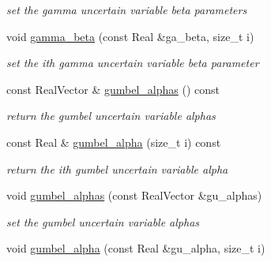 \begin{DoxyCompactItemize}
\begin{DoxyCompactList}\small\item\em set the gamma uncertain variable beta parameters \end{DoxyCompactList}\item 
void \hyperlink{classPecos_1_1AleatoryDistParams_a71537fcb2a324d0f6850eeacb54570cd}{gamma\+\_\+beta} (const Real \&ga\+\_\+beta, size\+\_\+t i)\label{classPecos_1_1AleatoryDistParams_a71537fcb2a324d0f6850eeacb54570cd}

\begin{DoxyCompactList}\small\item\em set the ith gamma uncertain variable beta parameter \end{DoxyCompactList}\item 
const Real\+Vector \& \hyperlink{classPecos_1_1AleatoryDistParams_ae4cc8a3646b394b15be4676cd3200bf1}{gumbel\+\_\+alphas} () const \label{classPecos_1_1AleatoryDistParams_ae4cc8a3646b394b15be4676cd3200bf1}

\begin{DoxyCompactList}\small\item\em return the gumbel uncertain variable alphas \end{DoxyCompactList}\item 
const Real \& \hyperlink{classPecos_1_1AleatoryDistParams_a4665d745cda45d1b57dbbc698bebb15c}{gumbel\+\_\+alpha} (size\+\_\+t i) const \label{classPecos_1_1AleatoryDistParams_a4665d745cda45d1b57dbbc698bebb15c}

\begin{DoxyCompactList}\small\item\em return the ith gumbel uncertain variable alpha \end{DoxyCompactList}\item 
void \hyperlink{classPecos_1_1AleatoryDistParams_aa4b0f908acc066a478f6941904d18279}{gumbel\+\_\+alphas} (const Real\+Vector \&gu\+\_\+alphas)\label{classPecos_1_1AleatoryDistParams_aa4b0f908acc066a478f6941904d18279}

\begin{DoxyCompactList}\small\item\em set the gumbel uncertain variable alphas \end{DoxyCompactList}\item 
void \hyperlink{classPecos_1_1AleatoryDistParams_a1556dd22bc76bf809eeeba1775fb4b66}{gumbel\+\_\+alpha} (const Real \&gu\+\_\+alpha, size\+\_\+t i)\label{classPecos_1_1AleatoryDistParams_a1556dd22bc76bf809eeeba1775fb4b66}


\end{DoxyCompactItemize}
